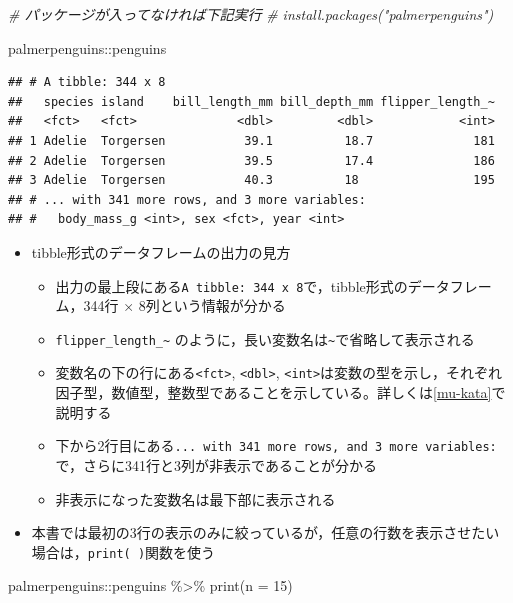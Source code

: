 \documentclass[
  xelatex,ja=standard, b5paper]{bxjsbook}
\newenvironment{Shaded}{\begin{snugshade}}{\end{snugshade}}
\newcommand{\AttributeTok}[1]{\textcolor[rgb]{0.77,0.63,0.00}{#1}}
\newcommand{\CommentTok}[1]{\textcolor[rgb]{0.56,0.35,0.01}{\textit{#1}}}
\newcommand{\DecValTok}[1]{\textcolor[rgb]{0.00,0.00,0.81}{#1}}
\newcommand{\FunctionTok}[1]{\textcolor[rgb]{0.00,0.00,0.00}{#1}}
\newcommand{\NormalTok}[1]{#1}
\newcommand{\SpecialCharTok}[1]{\textcolor[rgb]{0.00,0.00,0.00}{#1}}
\providecommand{\tightlist}{%
  \setlength{\itemsep}{0pt}\setlength{\parskip}{0pt}}
\begin{document}
\begin{Shaded}
\begin{Highlighting}[]
\CommentTok{\# パッケージが入ってなければ下記実行}
\CommentTok{\# install.packages("palmerpenguins")}

\NormalTok{palmerpenguins}\SpecialCharTok{::}\NormalTok{penguins}
\end{Highlighting}
\end{Shaded}

\begin{verbatim}
## # A tibble: 344 x 8
##   species island    bill_length_mm bill_depth_mm flipper_length_~
##   <fct>   <fct>              <dbl>         <dbl>            <int>
## 1 Adelie  Torgersen           39.1          18.7              181
## 2 Adelie  Torgersen           39.5          17.4              186
## 3 Adelie  Torgersen           40.3          18                195
## # ... with 341 more rows, and 3 more variables:
## #   body_mass_g <int>, sex <fct>, year <int>
\end{verbatim}

\begin{itemize}
\tightlist
\item
  tibble形式のデータフレームの出力の見方

  \begin{itemize}
  \tightlist
  \item
    出力の最上段にある\texttt{A\ tibble:\ 344\ x\ 8}で，tibble形式のデータフレーム，344行 × 8列という情報が分かる
  \item
    \texttt{flipper\_length\_\textasciitilde{}} のように，長い変数名は\texttt{\textasciitilde{}}で省略して表示される
  \item
    変数名の下の行にある\texttt{\textless{}fct\textgreater{}}, \texttt{\textless{}dbl\textgreater{}}, \texttt{\textless{}int\textgreater{}}は変数の型を示し，それぞれ因子型，数値型，整数型であることを示している。詳しくは\ref{mu-kata}で説明する
  \item
    下から2行目にある\texttt{...\ with\ 341\ more\ rows,\ and\ 3\ more\ variables:}で，さらに341行と3列が非表示であることが分かる
  \item
    非表示になった変数名は最下部に表示される
  \end{itemize}
\item
  本書では最初の3行の表示のみに絞っているが，任意の行数を表示させたい場合は，\texttt{print(\ )}関数を使う
\end{itemize}

\begin{Shaded}
\begin{Highlighting}[]
\NormalTok{palmerpenguins}\SpecialCharTok{::}\NormalTok{penguins }\SpecialCharTok{\%\textgreater{}\%} 
  \FunctionTok{print}\NormalTok{(}\AttributeTok{n =} \DecValTok{15}\NormalTok{)}
\end{Highlighting}
\end{Shaded}
\end{document}
